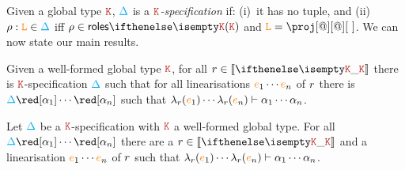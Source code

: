 Given a global type $\aK$, $\textcolor{cyan}{\Delta}$ is a \emph{$\aK$-specification} if:
(i)~it has no tuple, and 
(ii)~$\rho : \texttt{\textcolor{orange}L} \in \textcolor{cyan}{\Delta}$ iff $\arole \in \roles{\aK}$ and
$\aL = \proj[@][@][\ ]$.
%
We can now state our main results.
%
\begin{theorem}\label{thm:gt2local}
  Given a well-formed global type $\aK$, for all $\apom \in \ksem \aK$
  there is $\aK$-specification $\textcolor{cyan}{\Delta}$ such that for all
  linearisations ${\color{orange}{e}}_1 \cdots {\color{orange}{e}}_n$ of $r$ there is
  $\envmv \red[\alpha_1] \cdots \red[\alpha_n]$ such that
  $\lambda_{r}({\color{orange}{e}}_1) \cdots \lambda_{r}({\color{orange}{e}}_n) \vdash \alpha_1
  \cdots \alpha_n$.
\end{theorem}
%
\begin{theorem}\label{thm:local2gt}
  Let $\textcolor{cyan}{\Delta}$ be a $\aK$-specification with $\aK$ a well-formed
  global type.
  For all $\envmv \red[\alpha_1] \cdots \red[\alpha_n]$ there are a
  $\apom \in \ksem \aK$ and a linearisation ${\color{orange}{e}}_1 \cdots {\color{orange}{e}}_n$ of
  $r$ such that
  $\lambda_{r}({\color{orange}{e}}_1) \cdots \lambda_{r}({\color{orange}{e}}_n) \vdash \alpha_1
  \cdots \alpha_n$.
\end{theorem}


